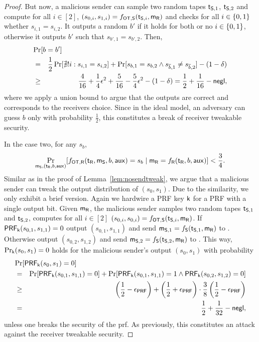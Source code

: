 \begin{proof}
But now, a malicious sender can sample two random tapes $\mathsf{t}_{\mathsf{S},1}$, $\mathsf{t}_{\mathsf{S},2}$
and compute for all $i\in[2]$, $(s_{0,i},s_{1,i})=f_{\mathsf{OT},\mathsf{S}}(\mathsf{t}_{\mathsf{S},i},\mathsf{m}_{\mathsf{R}})$ and checks for all $i\in\{0,1\}$ whether $s_{i,1}=s_{i,2}$. It outputs a random $b'$ if it holds for both or no $i\in\{0,1\}$, otherwise it outputs $b'$ such that $s_{b',1}=s_{b',2}$. Then,
\begin{eqnarray*}
\lefteqn{\Pr[b=b']}\\
&=&\frac{1}{2}\Pr[\nexists! i:s_{i,1}= s_{i,2}]+\Pr[s_{b,1}=s_{b,2}\wedge s_{\overline b,1}\neq s_{\overline b,2}]-(1-\delta)\\
&\geq& \frac{4}{16}+\frac{1}{4}\epsilon^2+\frac{5}{16}-\frac{5}{4}\epsilon^2-(1-\delta) =\frac{1}{2}+\frac{1}{16}-\negl
,
\end{eqnarray*}
where we apply a union bound to argue that the outputs are correct and corresponds to the receivers choice. Since in the ideal model, an adversary can guess $b$ only with probability $\frac{1}{2}$, this constitutes a break of receiver tweakable security.

In the case two, for any $s_b$,
$$
\Pr_{\mathsf{m}_{\mathsf{S}}, (\mathsf{t}_{\mathsf{R}},b,\mathsf{aux})}[f_{\mathsf{OT},\mathsf{R}}(\mathsf{t}_{\mathsf{R}},\mathsf{m}_{\mathsf{S}},b,\mathsf{aux})=s_b\mid \mathsf{m}_{\mathsf{R}}=f_{\mathsf{R}}(\mathsf{t}_{\mathsf{R}},b,\mathsf{aux})]<\frac{3}{4}.
$$
Similar as in the proof of Lemma~\ref{lem:nosendtweak}, we argue that a malicious sender can tweak the output distribution of $(s_0,s_1)$. Due to the similarity, we only exhibit a brief version. Again we hardwire a PRF key $\mathsf{k}$ for a PRF with a single output bit. Given $\mathsf{m}_{\mathsf{R}}$, the malicious sender samples two random tapes $\mathsf{t}_{\mathsf{S}, 1}$ and $\mathsf{t}_{\mathsf{S},2}$, computes for all $i\in[2]$ $(s_{0,i},s_{0,i})=f_{\mathsf{OT},\mathsf{S}}(\mathsf{t}_{\mathsf{S},i},\mathsf{m}_{\mathsf{R}})$. If $\mathsf{PRF}_{\mathsf{k}}(s_{0,1},s_{1,1})=0$ output $(s_{0,1},s_{1,1})$ and send $\mathsf{m}_{\mathsf{S},1}=f_{\mathsf{S}}(\mathsf{t}_{\mathsf{S},1},\mathsf{m}_{\mathsf{R}})$ to \rec. Otherwise output $(s_{0,2},s_{1,2})$ and send $\mathsf{m}_{\mathsf{S},2}=f_{\mathsf{S}}(\mathsf{t}_{\mathsf{S},2},\mathsf{m}_{\mathsf{R}})$ to \rec. This way, $\Pr_{\mathsf{k}}(s_0,s_1)=0$ holds for the malicious sender's output $(s_0,s_1)$ with probability 
\begin{eqnarray*}
\lefteqn{\Pr[\PRF_{\key}(s_0,s_1)=0]}\\
&=&\Pr[\PRF_{\key}(s_{0,1},s_{1,1})=0]+\Pr[\PRF_{\key}(s_{0,1},s_{1,1})=1\wedge\PRF_{\key}(s_{0,2},s_{1,2})=0]\\
&\geq&  \left(\frac{1}{2}-\epsilon_{\PRF}\right)+\left(\frac{1}{2}+\epsilon_{\PRF}\right)\cdot\frac{3}{8}\left(\frac{1}{2}-\epsilon_{\PRF}\right)\\
&=& \frac{1}{2}+\frac{1}{32}-\negl,
\end{eqnarray*}
unless one breaks the security of the prf. As previously, this constitutes an attack against the receiver tweakable security.
\end{proof}